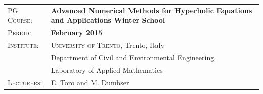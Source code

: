 \documentclass[a4paper, oneside, final]{scrartcl}
\newcommand{\gray}{\rowcolor[gray]{.90}} %
\begin{document}
\begin{tabularx}{0.97\linewidth}{>{\raggedright\scshape}p{4.4cm}|X}
\gray PG Course:  & \textbf{Advanced Numerical Methods for Hyperbolic Equations and Applications Winter School}\\
\gray Period:     & \textbf{February 2015}\\
Institute:        & \textsc{University of Trento}, \hfill Trento, Italy \\
                  & Department of Civil and Environmental Engineering, \\
                  & Laboratory of Applied Mathematics\\
Lecturers:        & E. Toro and M. Dumbser\\
\end{tabularx}
\end{document}
